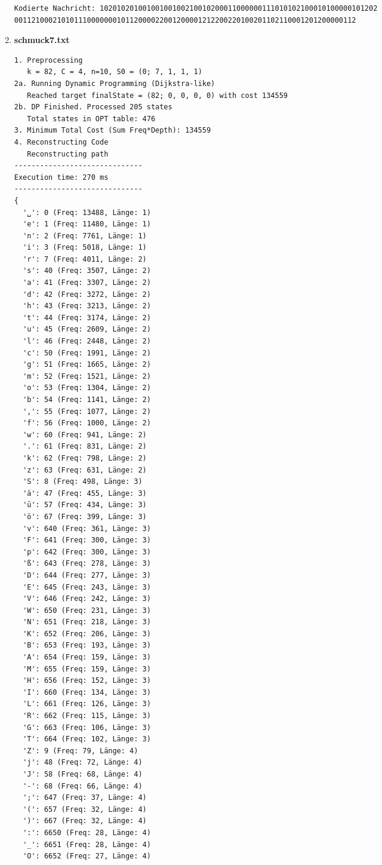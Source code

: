 \documentclass[a4paper,10pt,ngerman]{scrartcl}
\begin{document}
\begin{enumerate}
\begin{verbatim}
Kodierte Nachricht: 10201020100100100100210010200011000000111010102100010100000101202
00112100021010111000000010112000022001200001212200220100201102110001201200000112
  \end{verbatim}
  \item \textbf{schmuck7.txt}
\begin{verbatim}
1. Preprocessing
   k = 82, C = 4, n=10, S0 = (0; 7, 1, 1, 1)
2a. Running Dynamic Programming (Dijkstra-like)
   Reached target finalState = (82; 0, 0, 0, 0) with cost 134559
2b. DP Finished. Processed 205 states
   Total states in OPT table: 476
3. Minimum Total Cost (Sum Freq*Depth): 134559
4. Reconstructing Code
   Reconstructing path
------------------------------
Execution time: 270 ms
------------------------------
{
  '␣': 0 (Freq: 13488, Länge: 1)
  'e': 1 (Freq: 11480, Länge: 1)
  'n': 2 (Freq: 7761, Länge: 1)
  'i': 3 (Freq: 5018, Länge: 1)
  'r': 7 (Freq: 4011, Länge: 2)
  's': 40 (Freq: 3507, Länge: 2)
  'a': 41 (Freq: 3307, Länge: 2)
  'd': 42 (Freq: 3272, Länge: 2)
  'h': 43 (Freq: 3213, Länge: 2)
  't': 44 (Freq: 3174, Länge: 2)
  'u': 45 (Freq: 2609, Länge: 2)
  'l': 46 (Freq: 2448, Länge: 2)
  'c': 50 (Freq: 1991, Länge: 2)
  'g': 51 (Freq: 1665, Länge: 2)
  'm': 52 (Freq: 1521, Länge: 2)
  'o': 53 (Freq: 1304, Länge: 2)
  'b': 54 (Freq: 1141, Länge: 2)
  ',': 55 (Freq: 1077, Länge: 2)
  'f': 56 (Freq: 1000, Länge: 2)
  'w': 60 (Freq: 941, Länge: 2)
  '.': 61 (Freq: 831, Länge: 2)
  'k': 62 (Freq: 798, Länge: 2)
  'z': 63 (Freq: 631, Länge: 2)
  'S': 8 (Freq: 498, Länge: 3)
  'ä': 47 (Freq: 455, Länge: 3)
  'ü': 57 (Freq: 434, Länge: 3)
  'ö': 67 (Freq: 399, Länge: 3)
  'v': 640 (Freq: 361, Länge: 3)
  'F': 641 (Freq: 300, Länge: 3)
  'p': 642 (Freq: 300, Länge: 3)
  'ß': 643 (Freq: 278, Länge: 3)
  'D': 644 (Freq: 277, Länge: 3)
  'E': 645 (Freq: 243, Länge: 3)
  'V': 646 (Freq: 242, Länge: 3)
  'W': 650 (Freq: 231, Länge: 3)
  'N': 651 (Freq: 218, Länge: 3)
  'K': 652 (Freq: 206, Länge: 3)
  'B': 653 (Freq: 193, Länge: 3)
  'A': 654 (Freq: 159, Länge: 3)
  'M': 655 (Freq: 159, Länge: 3)
  'H': 656 (Freq: 152, Länge: 3)
  'I': 660 (Freq: 134, Länge: 3)
  'L': 661 (Freq: 126, Länge: 3)
  'R': 662 (Freq: 115, Länge: 3)
  'G': 663 (Freq: 106, Länge: 3)
  'T': 664 (Freq: 102, Länge: 3)
  'Z': 9 (Freq: 79, Länge: 4)
  'j': 48 (Freq: 72, Länge: 4)
  'J': 58 (Freq: 68, Länge: 4)
  '-': 68 (Freq: 66, Länge: 4)
  ';': 647 (Freq: 37, Länge: 4)
  '(': 657 (Freq: 32, Länge: 4)
  ')': 667 (Freq: 32, Länge: 4)
  ':': 6650 (Freq: 28, Länge: 4)
  '_': 6651 (Freq: 28, Länge: 4)
  'O': 6652 (Freq: 27, Länge: 4)

\end{verbatim}
\end{enumerate}
\end{document}
